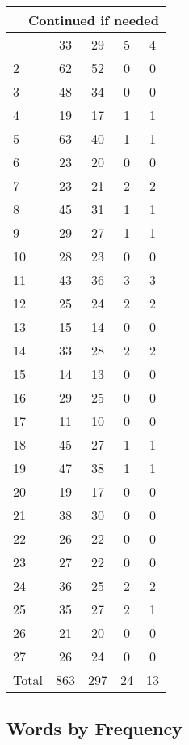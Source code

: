 \begin{center}
\begin{longtable}{l|c|c|c|c}
\hline \multicolumn{5}{|r|}{{Continued if needed}} \\ \hline
\endfoot 
1 & 33 & 29 & 5 & 4\\ \hline
2 & 62 & 52 & 0 & 0\\ \hline
3 & 48 & 34 & 0 & 0\\ \hline
4 & 19 & 17 & 1 & 1\\ \hline
5 & 63 & 40 & 1 & 1\\ \hline
6 & 23 & 20 & 0 & 0\\ \hline
7 & 23 & 21 & 2 & 2\\ \hline
8 & 45 & 31 & 1 & 1\\ \hline
9 & 29 & 27 & 1 & 1\\ \hline
10 & 28 & 23 & 0 & 0\\ \hline
11 & 43 & 36 & 3 & 3\\ \hline
12 & 25 & 24 & 2 & 2\\ \hline
13 & 15 & 14 & 0 & 0\\ \hline
14 & 33 & 28 & 2 & 2\\ \hline
15 & 14 & 13 & 0 & 0\\ \hline
16 & 29 & 25 & 0 & 0\\ \hline
17 & 11 & 10 & 0 & 0\\ \hline
18 & 45 & 27 & 1 & 1\\ \hline
19 & 47 & 38 & 1 & 1\\ \hline
20 & 19 & 17 & 0 & 0\\ \hline
21 & 38 & 30 & 0 & 0\\ \hline
22 & 26 & 22 & 0 & 0\\ \hline
23 & 27 & 22 & 0 & 0\\ \hline
24 & 36 & 25 & 2 & 2\\ \hline
25 & 35 & 27 & 2 & 1\\ \hline
26 & 21 & 20 & 0 & 0\\ \hline
27 & 26 & 24 & 0 & 0\\ \hline
\hline \hline
Total & 863 & 297 & 24 & 13



\end{longtable}
\end{center}

 
\subsection{Words by Frequency}

